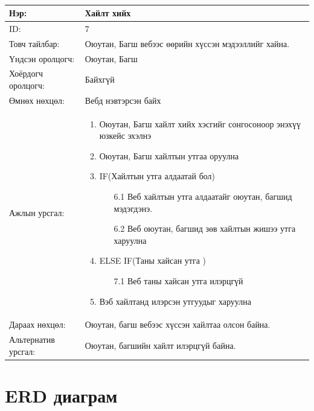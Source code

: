 \begin{center}
	\begin{table}[!htbp]
		\caption{} 
		\begin{tabular}{|p{4cm}|p{11cm}|}
			\hline
			Нэр: & Хайлт хийх  \\
			\hline
			ID: & 7 \\
			\hline
			Товч тайлбар: & Оюутан, Багш вебээс өөрийн хүссэн мэдээллийг хайна.  \\
			\hline
			Үндсэн оролцогч: & Оюутан, Багш \\
			\hline
			Хоёрдогч оролцогч: & Байхгүй  \\
			\hline
			Өмнөх нөхцөл: &  Вебд нэвтэрсэн байх \\
			\hline
			Ажлын урсгал: & \begin{enumerate}
				\item Оюутан, Багш хайлт хийх хэсгийг сонгосоноор энэхүү юзкейс эхэлнэ
				\item Оюутан, Багш хайлтын утгаа оруулна
				\item IF(Хайлтын утга алдаатай бол)
				\begin{enumerate}
					\item[6.1] Веб хайлтын утга алдаатайг оюутан, багшид мэдэгдэнэ.
					\item[6.2] Веб оюутан, багшид зөв хайлтын жишээ утга харуулна
				\end{enumerate}	
				\item ELSE IF(Таны хайсан утга )
				\begin{enumerate}
					\item[7.1] Веб таны хайсан утга илэрцгүй 
				\end{enumerate}
				\item Вэб хайлтанд илэрсэн утгуудыг харуулна
			\end{enumerate} 	\\
			\hline
			Дараах нөхцөл: & Оюутан, багш вебээс хүссэн хайлтаа олсон байна. \\
			\hline
			Альтернатив урсгал: & Оюутан, багшийн хайлт илэрцгүй байна.\\
			\hline
		\end{tabular}
	\end{table}
\end{center}

\newpage
\section{ERD диаграм}

